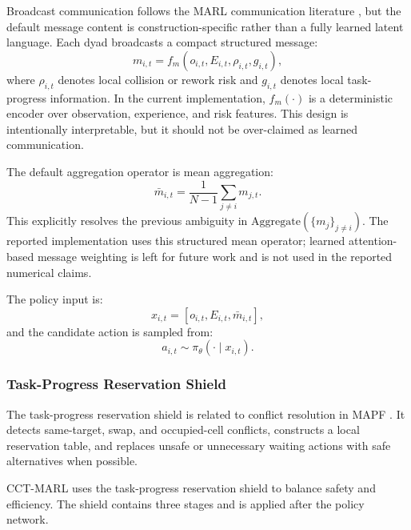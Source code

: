 \documentclass[fleqn,10pt]{wlpeerj}
\begin{document}
Broadcast communication follows the MARL communication literature \cite{Sukhbaatar2016CommNet,Foerster2016DIAL,Jiang2018ATOC,Das2019TarMAC}, but the default message content is construction-specific rather than a fully learned latent language. Each dyad broadcasts a compact structured message:
\begin{equation}
 m_{i,t}=f_m(o_{i,t},E_{i,t},\rho_{i,t},g_{i,t}),
\end{equation}
where $\rho_{i,t}$ denotes local collision or rework risk and $g_{i,t}$ denotes local task-progress information. In the current implementation, $f_m(\cdot)$ is a deterministic encoder over observation, experience, and risk features. This design is intentionally interpretable, but it should not be over-claimed as learned communication.

The default aggregation operator is mean aggregation:
\begin{equation}
\bar{m}_{i,t}=\frac{1}{N-1}\sum_{j\neq i}m_{j,t}.
\label{eq:mean_agg}
\end{equation}
This explicitly resolves the previous ambiguity in $\mathrm{Aggregate}(\{m_j\}_{j\neq i})$. The reported implementation uses this structured mean operator; learned attention-based message weighting is left for future work and is not used in the reported numerical claims.

The policy input is:
\begin{equation}
 x_{i,t}=[o_{i,t},E_{i,t},\bar{m}_{i,t}],
\end{equation}
and the candidate action is sampled from:
\begin{equation}
 a_{i,t}\sim\pi_{\theta}(\cdot\mid x_{i,t}).
\end{equation}

\subsubsection{Task-Progress Reservation Shield}

The task-progress reservation shield is related to conflict resolution in MAPF \cite{Sharon2015CBS,Stern2019MAPF,Li2021LifelongMAPF}. It detects same-target, swap, and occupied-cell conflicts, constructs a local reservation table, and replaces unsafe or unnecessary waiting actions with safe alternatives when possible.

CCT-MARL uses the task-progress reservation shield to balance safety and efficiency. The shield contains three stages and is applied after the policy network.
\end{document}
